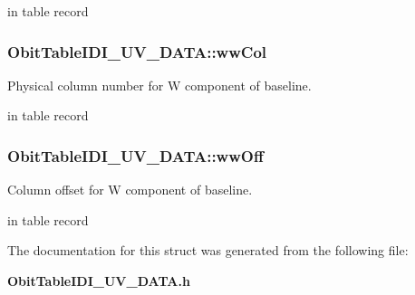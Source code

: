 in table record 
\subsubsection{ {\bf Obit\-Table\-IDI\_\-UV\_\-DATA::ww\-Col}}\label{structObitTableIDI__UV__DATA_o86}


Physical column number for W component of baseline. 

in table record 
\subsubsection{ {\bf Obit\-Table\-IDI\_\-UV\_\-DATA::ww\-Off}}\label{structObitTableIDI__UV__DATA_o85}


Column offset for W component of baseline. 

in table record 

The documentation for this struct was generated from the following file:\begin{CompactItemize}
\item 
{\bf Obit\-Table\-IDI\_\-UV\_\-DATA.h}\end{CompactItemize}
